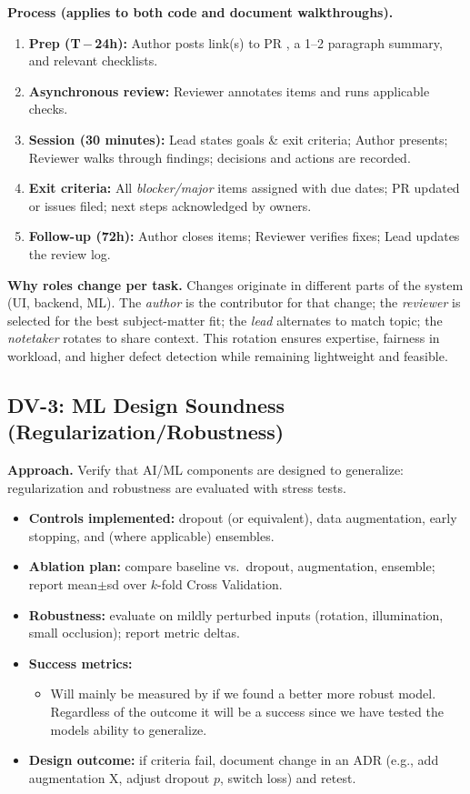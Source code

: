 \documentclass[12pt, titlepage]{article}
\begin{document}
\vspace{0.5em}
\noindent\textbf{Process (applies to both code and document walkthroughs).}
\begin{enumerate}
  \item \textbf{Prep (T\,$-$\,24h):} Author posts link(s) to PR , a 1--2 paragraph summary, and relevant checklists.
  \item \textbf{Asynchronous review:} Reviewer annotates items and runs applicable checks.
  \item \textbf{Session (30 minutes):} Lead states goals \& exit criteria; Author presents; Reviewer walks through findings; decisions and actions are recorded.
  \item \textbf{Exit criteria:} All \emph{blocker/major} items assigned with due dates; PR updated or issues filed; next steps acknowledged by owners.
  \item \textbf{Follow-up (72h):} Author closes items; Reviewer verifies fixes; Lead updates the review log.
\end{enumerate}

\vspace{0.25em}
\noindent\textbf{Why roles change per task.}
Changes originate in different parts of the system (UI, backend, ML). The \emph{author} is the contributor for that change; the \emph{reviewer} is selected for the best subject-matter fit; the \emph{lead} alternates to match topic; the \emph{notetaker} rotates to share context. This rotation ensures expertise, fairness in workload, and higher defect detection while remaining lightweight and feasible.


\subsection*{DV-3: ML Design Soundness (Regularization/Robustness)}
\textbf{Approach.} Verify that AI/ML components are designed to generalize: regularization and robustness are evaluated with
stress tests.
\begin{itemize}
  \item \textbf{Controls implemented:} dropout (or equivalent), data augmentation, early stopping, and (where applicable) ensembles.
  \item \textbf{Ablation plan:} compare baseline vs.\ dropout, augmentation, ensemble; report mean$\pm$sd over $k$-fold Cross Validation.
  \item \textbf{Robustness:} evaluate on mildly perturbed inputs (rotation, illumination, small occlusion); report metric deltas.
  \item \textbf{Success metrics:}
    \begin{itemize}
      \item Will mainly be measured by if we found a better more robust model. Regardless of the outcome it will be a success since we have tested the models ability to generalize.
    \end{itemize}
  \item \textbf{Design outcome:} if criteria fail, document change in an ADR (e.g., add augmentation X, adjust dropout $p$, switch loss) and retest.
\end{itemize}
\end{document}
